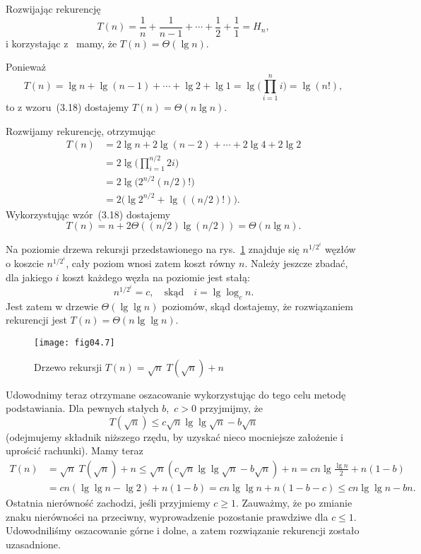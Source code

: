 \subexercise{} %
Rozwijając rekurencję
\[
	T(n) = \frac{1}{n}+\frac{1}{n-1}+\cdots+\frac{1}{2}+\frac{1}{1} = H_n,
\]
i korzystając z~ mamy, że $T(n)=\Theta(\lg n)$.

\subexercise{} %
Ponieważ
\[
	T(n) = \lg n+\lg(n-1)+\cdots+\lg2+\lg 1 = \lg\biggl(\prod_{i=1}^ni\biggr) = \lg(n!),
\]
to z wzoru~(3.18) dostajemy $T(n)=\Theta(n\lg n)$.

\subexercise{} %
Rozwijamy rekurencję, otrzymując
\begin{align*}
	T(n) &= 2\lg n+2\lg(n-2)+\cdots+2\lg4+2\lg2 \\
	&= 2\lg\biggl(\prod_{i=1}^{n/2}2i\biggr) \\
	&= 2\lg\bigl(2^{n/2}(n/2)!\bigr) \\
	&= 2\bigl(\lg 2^{n/2}+\lg((n/2)!)\bigr).
\end{align*}
Wykorzystując wzór~(3.18) dostajemy
\[
	T(n) = n+2\Theta((n/2)\lg (n/2)) = \Theta(n\lg n).
\]

\subexercise{} %
Na  poziomie drzewa rekursji przedstawionego na rys.~\ref{fig:4-4j} znajduje się $n^{1/2^i}$ węzłów o koszcie $n^{1/2^i}$, cały poziom wnosi zatem koszt równy $n$. Należy jeszcze zbadać, dla jakiego $i$ koszt każdego węzła na  poziomie jest stałą:
\[
	n^{1/2^i} = c, \quad\text{skąd}\quad i = \lg\log_cn.
\]
Jest zatem w drzewie $\Theta(\lg\lg n)$ poziomów, skąd dostajemy, że rozwiązaniem rekurencji jest $T(n)=\Theta(n\lg\lg n)$.
\begin{figure}[ht]
	\begin{center}
		\texttt{[image: fig04.7]}
	\caption{Drzewo rekursji $T(n)=\sqrt{n}\;T(\!\sqrt{n})+n$} \label{fig:4-4j}
	\end{center}
\end{figure}

Udowodnimy teraz otrzymane oszacowanie wykorzystując do tego celu metodę podstawiania. Dla pewnych stałych $b$,~$c>0$ przyjmijmy, że
\[
	T(\!\sqrt{n}) \le c\sqrt{n}\lg\lg\sqrt{n}-b\sqrt{n}
\]
(odejmujemy składnik niższego rzędu, by uzyskać nieco mocniejsze założenie i uprościć rachunki). Mamy teraz
\begin{align*}
	T(n) &= \sqrt{n}\;T(\!\sqrt{n})+n \le \sqrt{n}\left(c\sqrt{n}\lg\lg\sqrt{n}-b\sqrt{n}\right)+n = cn\lg\frac{\lg n}{2}+n(1-b) \\
	&= cn(\lg\lg n-\lg2)+n(1-b) = cn\lg\lg n+n(1-b-c) \le cn\lg\lg n-bn.
\end{align*}
Ostatnia nierówność zachodzi, jeśli przyjmiemy $c\ge1$. Zauważmy, że po zmianie znaku nierówności na przeciwny, wyprowadzenie pozostanie prawdziwe dla $c\le1$. Udowodniliśmy oszacowanie górne i dolne, a zatem rozwiązanie rekurencji zostało uzasadnione.

